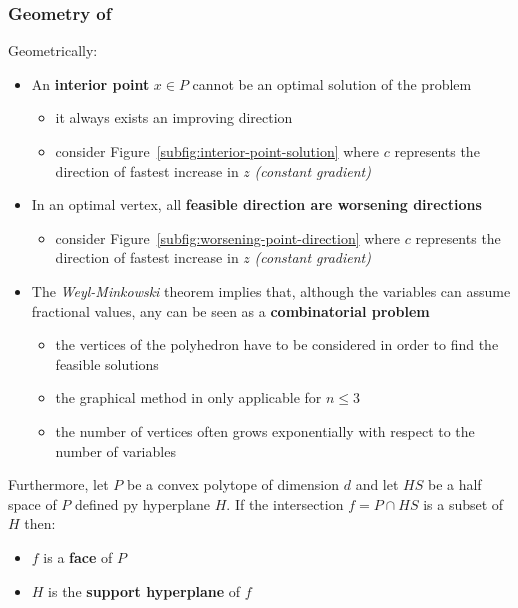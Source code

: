 \documentclass[english]{article}
\begin{document}
\subsubsection{Geometry of \LP}

Geometrically:

\begin{itemize}
  \item An \textbf{interior point} \(x \in P\) cannot be an optimal solution of the problem
        \begin{itemize}
          \item it always exists an improving direction
          \item consider Figure~\ref{subfig:interior-point-solution} where \(c\) represents the direction of fastest increase in \(z\) \textit{(constant gradient)}
        \end{itemize}
  \item In an optimal vertex, all \textbf{feasible direction are worsening directions}
        \begin{itemize}
          \item consider Figure~\ref{subfig:worsening-point-direction} where \(c\) represents the direction of fastest increase in \(z\) \textit{(constant gradient)}
        \end{itemize}
  \item The \textit{Weyl-Minkowski} theorem implies that, although the variables can assume fractional values, any \LP can be seen as a \textbf{combinatorial problem}
        \begin{itemize}
          \item {} the vertices of the polyhedron have to be considered in order to find the feasible solutions
          \item the graphical method in only applicable for \(n \leq 3\)
          \item the number of vertices often grows exponentially with respect to the number of variables
        \end{itemize}
\end{itemize}

\bigskip
Furthermore, let \(P\) be a convex polytope of dimension \(d\) and let \(HS\) be a half space of \(P\) defined py hyperplane \(H\).
If the intersection \(f = P \cap HS\) is a subset of \(H\) then:

\begin{itemize}
  \item \(f\) is a \textbf{face} of \(P\)
  \item \(H\) is the \textbf{support hyperplane} of \(f\)
\end{itemize}
\end{document}
